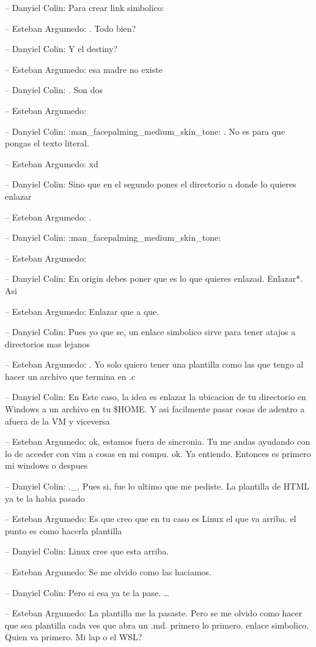 -- Danyiel Colin: Para crear link simbolico:

-- Esteban Argumedo: . Todo bien?

-- Danyiel Colin: Y el destiny?

-- Esteban Argumedo: esa madre no existe

-- Danyiel Colin: . Son dos

-- Esteban Argumedo:

-- Danyiel Colin: :man\_facepalming\_medium\_skin\_tone: . No es para
que pongas el texto literal.

-- Esteban Argumedo: xd

-- Danyiel Colin: Sino que en el segundo pones el directorio a donde lo
quieres enlazar

-- Esteban Argumedo: .

-- Danyiel Colin: :man\_facepalming\_medium\_skin\_tone:

-- Esteban Argumedo:

-- Danyiel Colin: En origin debes poner que es lo que quieres enlazad.
Enlazar*. Asi

-- Esteban Argumedo: Enlazar que a que.

-- Danyiel Colin: Pues yo que se, un enlace simbolico sirve para tener
atajos a directorios mas lejanos

-- Esteban Argumedo: . Yo solo quiero tener una plantilla como las que
tengo al hacer un archivo que termina en .c

-- Danyiel Colin: En Este caso, la idea es enlazar la ubicacion de tu
directorio en Windows a un archivo en tu \$HOME. Y asi facilmente pasar
cosas de adentro a afuera de la VM y viceversa

-- Esteban Argumedo: ok, estamos fuera de sincronia. Tu me andas
ayudando con lo de acceder con vim a cosas en mi compu. ok. Ya entiendo.
Entonces es primero mi windows o despues

-- Danyiel Colin: .\_. Pues si, fue lo ultimo que me pediste. La
plantilla de HTML ya te la habia pasado

-- Esteban Argumedo: Es que creo que en tu caso es Linux el que va
arriba. el punto es como hacerla plantilla

-- Danyiel Colin: Linux cree que esta arriba.

-- Esteban Argumedo: Se me olvido como las haciamos.

-- Danyiel Colin: Pero si esa ya te la pase. \ldots{}

-- Esteban Argumedo: La plantilla me la pasaste. Pero se me olvido como
hacer que sea plantilla cada ves que abra un .md. primero lo primero.
enlace simbolico. Quien va primero. Mi lap o el WSL?

